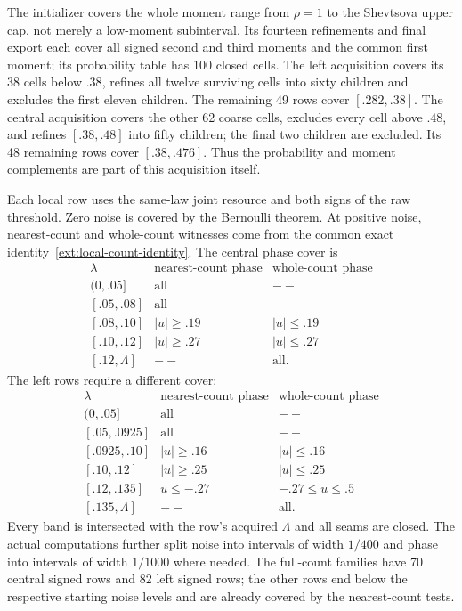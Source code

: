 The initializer covers the whole moment range from $\rho=1$ to the
Shevtsova upper cap, not merely a low-moment subinterval. Its fourteen
refinements and final export each cover all signed second and third
moments and the common first moment; its probability table has 100
closed cells. The left acquisition covers its 38 cells below $.38$,
refines all twelve surviving cells into sixty children and excludes
the first eleven children. The remaining 49 rows cover $[.282,.38]$.
The central acquisition covers the other 62 coarse cells, excludes
every cell above $.48$, and refines $[.38,.48]$ into fifty children;
the final two children are excluded. Its 48 remaining rows cover
$[.38,.476]$. Thus the probability and moment complements are part of
this acquisition itself.

Each local row uses the same-law joint resource and both signs of the
raw threshold. Zero noise is covered by the Bernoulli theorem. At
positive noise, nearest-count and whole-count witnesses come from
the common exact identity~\eqref{ext:local-count-identity}.
The central phase cover is
\[
\begin{array}{c|c|c}
 \lambda&\text{nearest-count phase}&\text{whole-count phase}\\
 (0,.05]&\text{all}&--\\
 {[.05,.08]}&\text{all}&--\\
 {[.08,.10]}&|u|\ge.19&|u|\le.19\\
 {[.10,.12]}&|u|\ge.27&|u|\le.27\\
 {[.12,\Lambda]}&--&\text{all}.
\end{array}
\]
The left rows require a different cover:
\[
\begin{array}{c|c|c}
 \lambda&\text{nearest-count phase}&\text{whole-count phase}\\
 (0,.05]&\text{all}&--\\
 {[.05,.0925]}&\text{all}&--\\
 {[.0925,.10]}&|u|\ge.16&|u|\le.16\\
 {[.10,.12]}&|u|\ge.25&|u|\le.25\\
 {[.12,.135]}&u\le-.27&-.27\le u\le.5\\
 {[.135,\Lambda]}&--&\text{all}.
\end{array}
\]
Every band is intersected with the row's acquired $\Lambda$ and all
seams are closed. The actual computations further split noise into
intervals of width $1/400$ and phase into intervals of width $1/1000$
where needed. The full-count families have 70 central signed rows and
82 left signed rows; the other rows end below the respective starting
noise levels and are already covered by the nearest-count tests.


